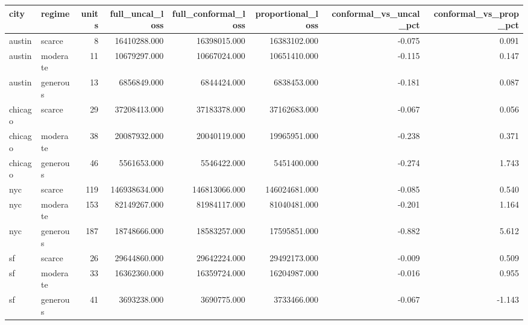\begin{tabular}{llrrrrrr}
\toprule
city & regime & units & full\_uncal\_loss & full\_conformal\_loss & proportional\_loss & conformal\_vs\_uncal\_pct & conformal\_vs\_prop\_pct \\
\midrule
austin & scarce & 8 & 16410288.000 & 16398015.000 & 16383102.000 & -0.075 & 0.091 \\
austin & moderate & 11 & 10679297.000 & 10667024.000 & 10651410.000 & -0.115 & 0.147 \\
austin & generous & 13 & 6856849.000 & 6844424.000 & 6838453.000 & -0.181 & 0.087 \\
chicago & scarce & 29 & 37208413.000 & 37183378.000 & 37162683.000 & -0.067 & 0.056 \\
chicago & moderate & 38 & 20087932.000 & 20040119.000 & 19965951.000 & -0.238 & 0.371 \\
chicago & generous & 46 & 5561653.000 & 5546422.000 & 5451400.000 & -0.274 & 1.743 \\
nyc & scarce & 119 & 146938634.000 & 146813066.000 & 146024681.000 & -0.085 & 0.540 \\
nyc & moderate & 153 & 82149267.000 & 81984117.000 & 81040481.000 & -0.201 & 1.164 \\
nyc & generous & 187 & 18748666.000 & 18583257.000 & 17595851.000 & -0.882 & 5.612 \\
sf & scarce & 26 & 29644860.000 & 29642224.000 & 29492173.000 & -0.009 & 0.509 \\
sf & moderate & 33 & 16362360.000 & 16359724.000 & 16204987.000 & -0.016 & 0.955 \\
sf & generous & 41 & 3693238.000 & 3690775.000 & 3733466.000 & -0.067 & -1.143 \\
\bottomrule
\end{tabular}
